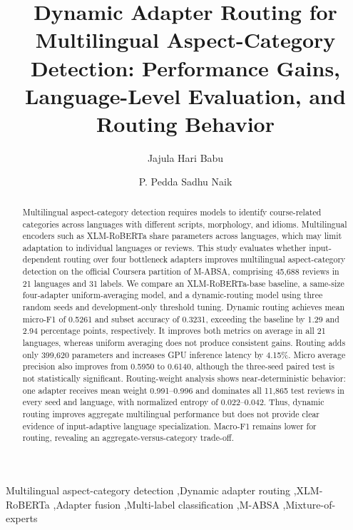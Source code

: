 \documentclass[review,12pt]{elsarticle}
\begin{document}
\begin{frontmatter}

\title{Dynamic Adapter Routing for Multilingual Aspect-Category Detection: Performance Gains, Language-Level Evaluation, and Routing Behavior}

\author[inst1]{Jajula Hari Babu}
\author[inst2]{P. Pedda Sadhu Naik}




\begin{abstract}
Multilingual aspect-category detection requires models to identify course-related categories across languages with different scripts, morphology, and idioms. Multilingual encoders such as XLM-RoBERTa share parameters across languages, which may limit adaptation to individual languages or reviews. This study evaluates whether input-dependent routing over four bottleneck adapters improves multilingual aspect-category detection on the official Coursera partition of M-ABSA, comprising 45,688 reviews in 21 languages and 31 labels. We compare an XLM-RoBERTa-base baseline, a same-size four-adapter uniform-averaging model, and a dynamic-routing model using three random seeds and development-only threshold tuning. Dynamic routing achieves mean micro-F1 of 0.5261 and subset accuracy of 0.3231, exceeding the baseline by 1.29 and 2.94 percentage points, respectively. It improves both metrics on average in all 21 languages, whereas uniform averaging does not produce consistent gains. Routing adds only 399,620 parameters and increases GPU inference latency by 4.15\%. Micro average precision also improves from 0.5950 to 0.6140, although the three-seed paired test is not statistically significant. Routing-weight analysis shows near-deterministic behavior: one adapter receives mean weight 0.991--0.996 and dominates all 11,865 test reviews in every seed and language, with normalized entropy of 0.022--0.042. Thus, dynamic routing improves aggregate multilingual performance but does not provide clear evidence of input-adaptive language specialization. Macro-F1 remains lower for routing, revealing an aggregate-versus-category trade-off.
\end{abstract}

\begin{keyword}
Multilingual aspect-category detection \sep Dynamic adapter routing \sep XLM-RoBERTa \sep Adapter fusion \sep Multi-label classification \sep M-ABSA \sep Mixture-of-experts
\end{keyword}

\end{frontmatter}
\end{document}
